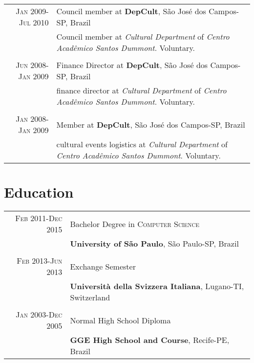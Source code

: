\documentclass[a4paper,10pt]{article} %
\begin{document}
\begin{tabular}{r|p{11cm}}

\textsc{Jan 2009-Jul 2010} & Council member at \textbf{DepCult}, São José dos Campos-SP, Brazil \emph{}\\
& \footnotesize{Council member at \emph{Cultural Department} of 
       \emph{Centro Acad\^{e}mico Santos Dummont}. Voluntary.}\\
\multicolumn{2}{c}{} \\



\textsc{Jun 2008-Jan 2009} & Finance Director at \textbf{DepCult}, São José dos Campos-SP, Brazil \emph{}\\
& \footnotesize{finance director at \emph{Cultural Department} of 
       \emph{Centro Acad\^{e}mico Santos Dummont}. Voluntary.}\\
\multicolumn{2}{c}{}\\



\textsc{Jan 2008-Jan 2009} & Member at \textbf{DepCult}, São José dos Campos-SP, Brazil \emph{}\\
& \footnotesize{cultural events logistics at \emph{Cultural Department} of \emph{Centro Acad\^{e}mico Santos Dummont}. Voluntary.}\\

\end{tabular}



\section{Education}

\begin{tabular}{r|p{11cm}}
\textsc{Feb} 2011-\textsc{Dec} 2015& Bachelor Degree in \textsc{}\textsc{Computer Science} \\& \normalsize\textbf{University of São Paulo}, São Paulo-SP, Brazil\\
\multicolumn{2}{c}{}\\


\textsc{Feb} 2013-\textsc{Jun} 2013& Exchange Semester\\
    & \textbf{Università della Svizzera Italiana}, Lugano-TI, Switzerland\\
\multicolumn{2}{c}{}\\
    

\textsc{Jan} 2003-\textsc{Dec} 2005& Normal High School Diploma\\
  & \textbf{GGE High School and Course}, Recife-PE, Brazil
\end{tabular}
\end{document}
